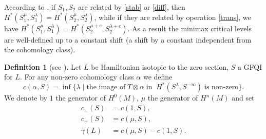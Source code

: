 \documentclass[JEP,XML,SOM,NoFloatCountersInSection,Unicode,published]{cedram}
\numberwithin{equation}{section}
\newcommand{\GFQI}{\textup{GFQI}\xspace}
\theoremstyle{plain}
\theoremstyle{definition}
\newtheorem{definition}[theorem]{Definition}
\theoremstyle{remark}
\begin{document}
According to \cite{Viterbo-STAGGF}, if $S_{1}, S_{2}$ are related by \eqref{stab} or \eqref{diff}, then $H^{*}(S_{1}^{\mu}, S_{1}^{\lambda}) = H^{*}(S_{2}^{\mu}, S_{2}^{\lambda})$, while if they are related by operation \eqref{trans}, we have $H^{*}(S_{1}^{\mu}, S_{1}^{\lambda}) = H^{*}(S_{2}^{\mu+c}, S_{2}^{\lambda+c})$. As a result the minimax critical levels are well-defined up to a constant shift (\ie a shift by a constant independent from the cohomology class).
\begin{definition}[see {\cite[Def.\,2.1]{Viterbo-STAGGF}}]\label{Def-3.3}
Let $L$ be Hamiltonian isotopic to the zero section, $S$ a \GFQI for $L$. For any non-zero cohomology class $\alpha$ we define
\[
c(\alpha, S)= \inf\{\lambda \mid \text{the image of}\; T\otimes \alpha\; \text{in}\;\; H^{*}(S^{\lambda}, S^{-\infty})\; \text{is non-zero}\}.
\]We denote by $1$ the generator of $H^0(M)$, $\mu$ the generator of $H^n(M)$ and set
\begin{align*}
c_{-}(S) & =  c(1,S), \\
c_{+}(S) & =  c(\mu,S),\\
\gamma (L) & = c(\mu, S) - c (1,S).
\end{align*}
\end{definition}
\end{document}
